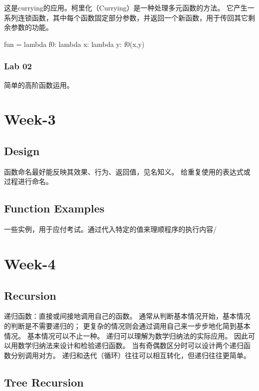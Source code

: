 \documentclass{ctexart}
\begin{document}
这是currying的应用。柯里化（Currying）是一种处理多元函数的方法。
它产生一系列连锁函数，其中每个函数固定部分参数，并返回一个新函数，用于传回其它剩余参数的功能。

\begin{python}
    fun = lambda f0: lambda x: lambda y: f0(x,y)   
\end{python}

\subsubsection{Lab 02}

简单的高阶函数运用。

\section{Week-3}

\subsection{Design}

函数命名最好能反映其效果、行为、返回值，见名知义。
给重复使用的表达式或过程进行命名。

\subsection{Function Examples}

 一些实例，用于应付考试。通过代入特定的值来理顺程序的执行内容/
 
\section{Week-4}

\subsection{Recursion}

递归函数：直接或间接地调用自己的函数。
通常从判断基本情况开始，基本情况的判断是不需要递归的；
更复杂的情况则会通过调用自己来一步步地化简到基本情况。
基本情况可以不止一种。
递归可以理解为数学归纳法的实际应用。
因此可以用数学归纳法来设计和检验递归函数。
当有奇偶数区分时可以设计两个递归函数分别调用对方。
递归和迭代（循环）往往可以相互转化，但递归往往更简单。

\subsection{Tree Recursion}
\end{document}
